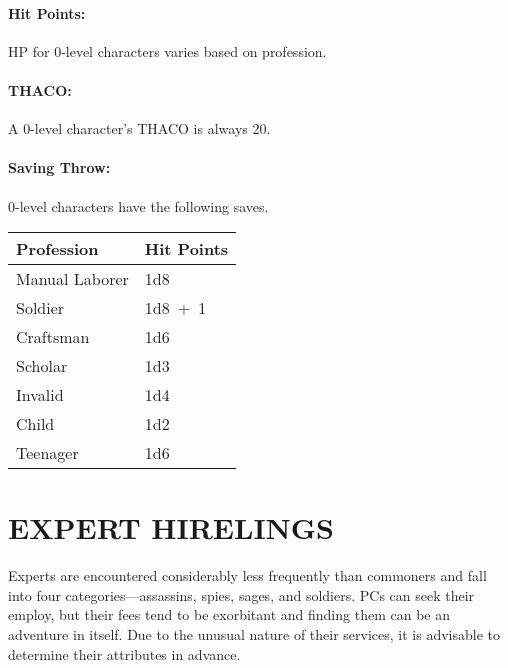\begin{multicols}{2}
\paragraph{Hit Points:} HP for 0-level characters varies based on profession.

\paragraph{THACO:} A 0-level character's THACO is always 20.
 
\paragraph{Saving Throw:} 0-level characters have the following saves.  

\noindent
\begin{minipage}{\columnwidth}

\label{zerolevelhp}
\noindent
\begin{tabular}{|p{}|p{}|}
\hline
Profession	& Hit Points \\
\hline\hline
\rowcolor[gray]{.9}Manual Laborer	& 1d8 \\
Soldier	& 1d8~+~1 \\
\rowcolor[gray]{.9}Craftsman	& 1d6 \\
Scholar	& 1d3 \\
\rowcolor[gray]{.9}Invalid	& 1d4 \\
Child	& 1d2 \\
\rowcolor[gray]{.9}Teenager	& 1d6 \\
\hline
\end{tabular}

\end{minipage}

\section{EXPERT HIRELINGS}

Experts are encountered considerably less frequently than commoners and fall into four categories---assassins, spies, sages, and soldiers.  PCs can seek their employ, but their fees tend to be exorbitant and finding them can be an adventure in itself.  Due to the unusual nature of their services, it is advisable to determine their attributes in advance.


\end{multicols}
